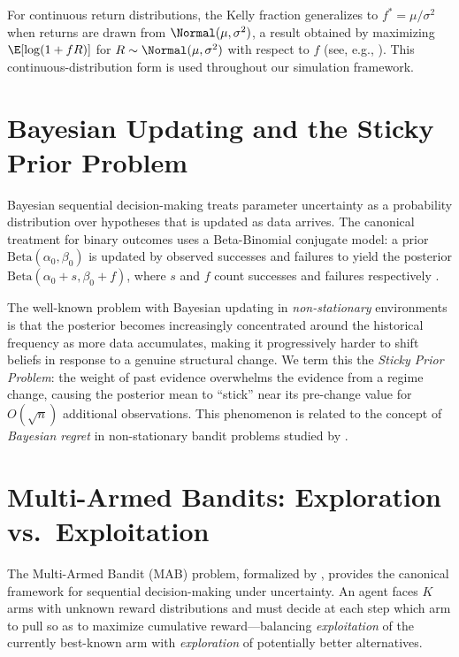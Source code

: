 For continuous return distributions, the Kelly fraction generalizes to
$f^* = \mu / \sigma^2$ when returns are drawn from $\Normal(\mu, \sigma^2)$,
a result obtained by maximizing $\E[\log(1 + fR)]$ for $R \sim \Normal(\mu,
\sigma^2)$ with respect to $f$ (see, e.g., \textcite{thorp2008}). This
continuous-distribution form is used throughout our simulation framework.

\section{Bayesian Updating and the Sticky Prior Problem}

Bayesian sequential decision-making treats parameter uncertainty as a
probability distribution over hypotheses that is updated as data arrives.
The canonical treatment for binary outcomes uses a Beta-Binomial conjugate
model: a prior $\text{Beta}(\alpha_0, \beta_0)$ is updated by observed
successes and failures to yield the posterior
$\text{Beta}(\alpha_0 + s, \beta_0 + f)$, where $s$ and $f$ count successes
and failures respectively \parencite{degroot1970}.

The well-known problem with Bayesian updating in \emph{non-stationary}
environments is that the posterior becomes increasingly concentrated around the
historical frequency as more data accumulates, making it progressively harder
to shift beliefs in response to a genuine structural change. We term this the
\emph{Sticky Prior Problem}: the weight of past evidence overwhelms the
evidence from a regime change, causing the posterior mean to ``stick'' near its
pre-change value for $O(\sqrt{n})$ additional observations. This phenomenon
is related to the concept of \emph{Bayesian regret} in non-stationary bandit
problems studied by \textcite{besbes2014stochastic}.

\section{Multi-Armed Bandits: Exploration vs.\ Exploitation}

The Multi-Armed Bandit (MAB) problem, formalized by \textcite{robbins1952},
provides the canonical framework for sequential decision-making under
uncertainty. An agent faces $K$ arms with unknown reward distributions and
must decide at each step which arm to pull so as to maximize cumulative
reward---balancing \emph{exploitation} of the currently best-known arm with
\emph{exploration} of potentially better alternatives.

